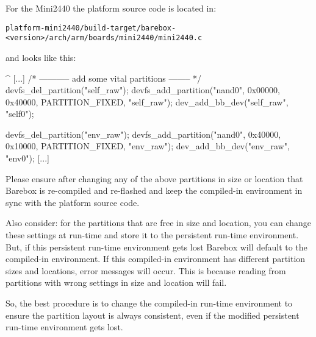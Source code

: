 For the Mini2440 the platform source code is located in:

\texttt{platform-mini2440/build-target/barebox-<version>/arch/arm/boards/mini2440/mini2440.c}

and looks like this:

\begin{ptxshell}[escapechar=|]{^}
[...]
      /* ----------- add some vital partitions -------- */
   devfs_del_partition("self_raw");
   devfs_add_partition("nand0", 0x00000, 0x40000, PARTITION_FIXED, "self_raw");
   dev_add_bb_dev("self_raw", "self0");

   devfs_del_partition("env_raw");
   devfs_add_partition("nand0", 0x40000, 0x10000, PARTITION_FIXED, "env_raw");
   dev_add_bb_dev("env_raw", "env0");
[...]
\end{ptxshell}

Please ensure after changing any of the above partitions in size or location
that Barebox is re-compiled and re-flashed and keep the compiled-in environment
in sync with the platform source code.

Also consider: for the partitions that are free in size and location, you can
change these settings at run-time and store it to the persistent run-time
environment. But, if this persistent run-time environment gets lost Barebox
will default to the compiled-in environment. If this compiled-in environment
has different partition sizes and locations, error messages will occur. This
is because reading from partitions with wrong settings in size and location
will fail.

So, the best procedure is to change the compiled-in run-time environment to
ensure the partition layout is always consistent, even if the modified
persistent run-time environment gets lost.
